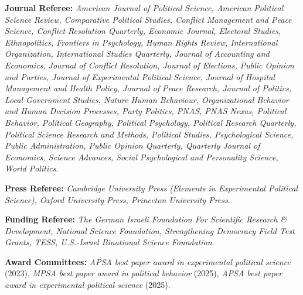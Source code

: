 \documentclass[11pt]{article}
\renewcommand{\section}[1]{%
    \Needspace{5\baselineskip}%
    \pagebreak[3]%
    \vspace{1.15\baselineskip}%
    \phantomsection\addcontentsline{toc}{section}{#1}%
    \noindent\llap{\bfseries\scshape\smash{\parbox[t]{\marginparwidth}{\hyphenpenalty=10000\raggedright #1}}}%
    \vspace{-\baselineskip}\par
    \vspace{.10in}}%
\newenvironment{cvhang}[1][1.5em]
  {\RaggedRight
   \begin{list}{}{%
     \setlength{\leftmargin}{#1}%
     \setlength{\itemindent}{-#1}%
     \setlength{\labelwidth}{0pt}\setlength{\labelsep}{0pt}%
     \setlength{\rightmargin}{0pt}%
     \setlength{\topsep}{0pt}\setlength{\partopsep}{0pt}%
     \setlength{\parsep}{0pt}\setlength{\itemsep}{2.5pt}}}
  {\end{list}}
\begin{document}
\section{Service}
\begin{cvhang}
\item {\bf Journal Referee:} \emph{American Journal of Political Science, American Political Science Review, Comparative Political Studies, Conflict Management and Peace Science, Conflict Resolution Quarterly, Economic Journal, Electoral Studies, Ethnopolitics, Frontiers in Psychology, Human Rights Review, International Organization, International Studies Quarterly, Journal of Accounting and Economics, Journal of Conflict Resolution, Journal of Elections, Public Opinion and Parties, Journal of Experimental Political Science, Journal of Hospital Management and Health Policy, Journal of Peace Research, Journal of Politics, Local Government Studies, Nature Human Behaviour, Organizational Behavior and Human Decision Processes, Party Politics, PNAS, PNAS Nexus, Political Behavior, Political Geography, Political Psychology, Political Research Quarterly, Political Science Research and Methods, Political Studies, Psychological Science, Public Administration, Public Opinion Quarterly, Quarterly Journal of Economics, Science Advances, Social Psychological and Personality Science, World Politics}.\\

\item {\bf Press Referee:} \emph{Cambridge University Press (Elements in Experimental Political Science), Oxford University Press, Princeton University Press}.\\

\item {\bf Funding Referee:} \emph{The German Israeli Foundation For Scientific Research \& Development, National Science Foundation, Strengthening Democracy Field Test Grants, TESS, U.S.-Israel Binational Science Foundation}.\\

\item {\bf Award Committees:} \emph{APSA best paper award in experimental political science} (2023), \emph{MPSA best paper award in political behavior} (2025), \emph{APSA best paper award in experimental political science} (2025).\\


\end{cvhang}
\end{document}
